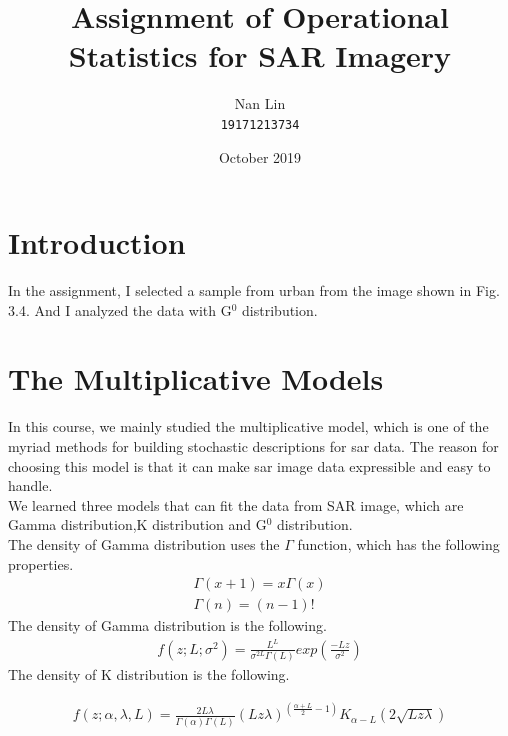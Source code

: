\documentclass{article}
\title{Assignment of Operational Statistics for SAR Imagery}
\author{Nan Lin\\ \texttt{19171213734} }
\date{October 2019}
\begin{document}
\maketitle

\section{Introduction}
In the assignment, I selected a sample from urban from the image shown in Fig. 3.4. And I analyzed the data with G$^0$ distribution. 

\section{The Multiplicative Models}
In this course, we mainly studied the multiplicative model, which is one of the myriad methods for building stochastic descriptions for sar data. The reason for choosing this model is that it can make sar image data expressible and easy to handle.\\
We learned three models that can fit the data from SAR image, which are Gamma distribution,K distribution and G$^0$ distribution.\\
The density of Gamma distribution uses the $\Gamma$ function, which has the following properties.
\begin{eqnarray}
\Gamma(x+1)=x\Gamma(x)\\
\Gamma(n)=(n-1)!  
\end{eqnarray}
The density of Gamma distribution is the following.
\begin{eqnarray}
f(z;L;\sigma^2)=\frac{L^L}{\sigma^{2L}\Gamma(L)}exp(\frac{-Lz}{\sigma^2})
\end{eqnarray}
The density of K distribution is the following.

\begin{eqnarray}
f(z;\alpha,\lambda,L)=\frac{2L\lambda}{\Gamma(\alpha)\Gamma(L)}(Lz\lambda)^(\frac{\alpha+L}{2}-1)K_{\alpha-L}(2\sqrt{Lz\lambda})
\end{eqnarray}
\end{document}
